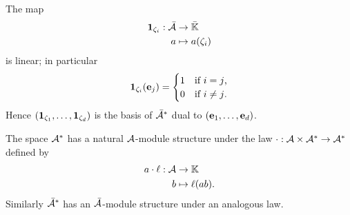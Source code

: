 The map
\begin{equation}
  \label{eq:8}
  \begin{aligned}
  \mathbf{1}_{\zeta_i} : \bar{\mathcal{A}} &\rightarrow \bar{\mathbb{K}}\\
  a &\mapsto a(\zeta_i)
  \end{aligned}
\end{equation}
is linear; in particular
\begin{equation}
  \label{eq:9}
  \mathbf{1}_{\zeta_i}(\mathbf{e}_j) =
  \begin{cases}
    1 &\text{if $i=j$,}\\
    0 &\text{if $i\ne j$.}
  \end{cases}
\end{equation}
Hence $(\mathbf{1}_{\zeta_1},\ldots,\mathbf{1}_{\zeta_d})$ is the basis
of $\bar{\mathcal{A}}^\ast$ dual to $(\mathbf{e}_1,\ldots,\mathbf{e}_d)$.

 The space $\mathcal{A}^\ast$ has a natural
$\mathcal{A}$-module structure under the law
$\cdot:\mathcal{A}\times\mathcal{A}^\ast\rightarrow\mathcal{A}^\ast$ defined by
\begin{equation}
  \label{eq:10}
  \begin{aligned}
    a\cdot\ell : \mathcal{A} &\rightarrow \mathbb{K}\\
    b &\mapsto \ell(ab)
    \text{.}
  \end{aligned}
\end{equation}
Similarly $\bar{\mathcal{A}}^\ast$ has an $\bar{\mathcal{A}}$-module
structure under an analogous law.

